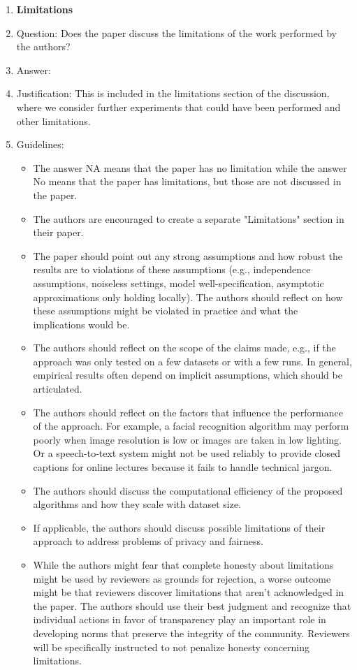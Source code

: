 \documentclass{article}
\theoremstyle{plain}
\theoremstyle{definition}
\theoremstyle{remark}
\begin{document}
\begin{enumerate}
\item {\bf Limitations}
    \item[] Question: Does the paper discuss the limitations of the work performed by the authors?
    \item[] Answer: \answerYes{} %
    \item[] Justification: This is included in the limitations section of the discussion, where we consider further experiments that could have been performed and other limitations.
    \item[] Guidelines:
    \begin{itemize}
        \item The answer NA means that the paper has no limitation while the answer No means that the paper has limitations, but those are not discussed in the paper. 
        \item The authors are encouraged to create a separate "Limitations" section in their paper.
        \item The paper should point out any strong assumptions and how robust the results are to violations of these assumptions (e.g., independence assumptions, noiseless settings, model well-specification, asymptotic approximations only holding locally). The authors should reflect on how these assumptions might be violated in practice and what the implications would be.
        \item The authors should reflect on the scope of the claims made, e.g., if the approach was only tested on a few datasets or with a few runs. In general, empirical results often depend on implicit assumptions, which should be articulated.
        \item The authors should reflect on the factors that influence the performance of the approach. For example, a facial recognition algorithm may perform poorly when image resolution is low or images are taken in low lighting. Or a speech-to-text system might not be used reliably to provide closed captions for online lectures because it fails to handle technical jargon.
        \item The authors should discuss the computational efficiency of the proposed algorithms and how they scale with dataset size.
        \item If applicable, the authors should discuss possible limitations of their approach to address problems of privacy and fairness.
        \item While the authors might fear that complete honesty about limitations might be used by reviewers as grounds for rejection, a worse outcome might be that reviewers discover limitations that aren't acknowledged in the paper. The authors should use their best judgment and recognize that individual actions in favor of transparency play an important role in developing norms that preserve the integrity of the community. Reviewers will be specifically instructed to not penalize honesty concerning limitations.
    \end{itemize}


\end{enumerate}
\end{document}
